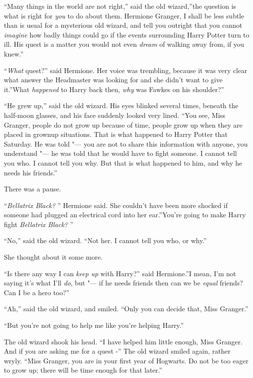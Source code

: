 ``Many things in the world are not right,'' said the old wizard,''the
question is what is right for \emph{you} to do about them. Hermione
Granger, I shall be less subtle than is usual for a mysterious old
wizard, and tell you outright that you cannot \emph{imagine} how badly
things could go if the events surrounding Harry Potter turn to ill. His
quest is a matter you would not even \emph{dream} of walking away from,
if you knew.''

``\emph{What} quest?'' said Hermione. Her voice was trembling, because it
was very clear what answer the Headmaster was looking for and she didn't
want to give it.''What \emph{happened} to Harry back then, \emph{why}
was Fawkes on his shoulder?''

``He grew up,'' said the old wizard. His eyes blinked several times,
beneath the half-moon glasses, and his face suddenly looked very lined.
``You see, Miss Granger, people do not grow up because of time, people
grow up when they are placed in grownup situations. That is what
happened to Harry Potter that Saturday. He was told "--- you are not to
share this information with anyone, you understand "--- he was told that he
would have to fight someone. I cannot tell you who. I cannot tell you
why. But that is what happened to him, and why he needs his friends.''

There was a pause.

``\emph{Bellatrix Black?} '' Hermione said. She couldn't have been more
shocked if someone had plugged an electrical cord into her ear.''You're
going to make Harry fight \emph{Bellatrix Black?} ''

``No,'' said the old wizard. ``Not her. I cannot tell you who, or why.''

She thought about it some more.

``Is there any way I can \emph{keep up} with Harry?'' said Hermione.''I
mean, I'm not saying it's what I'll \emph{do}, but "--- if he needs friends
then can we be \emph{equal} friends? Can I be a hero too?''

``Ah,'' said the old wizard, and smiled. ``Only you can decide that,
Miss Granger.''

``But you're not going to help me like you're helping Harry.''

The old wizard shook his head. ``I have helped him little enough, Miss
Granger. And if you are asking me for a quest -'' The old wizard smiled
again, rather wryly. ``Miss Granger, you are in your first year of
Hogwarts. Do not be too eager to grow up; there will be time enough for
that later.''

